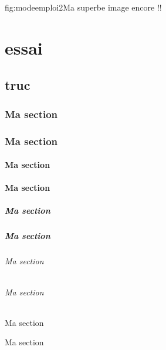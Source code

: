 \documentclass[overfullbox]{polytech}
\begin{document}
\begin{Figure}{fig:modeemploi2}{Ma superbe image encore !!}
\end{Figure}

\part{essai}
\label{part:essai}

\chapter{truc}
\lipsum[1-20]

\ref{part:essai}

\section{Ma section}
\lipsum[1-5]

\section{Ma section}
\lipsum[1-5]

\subsection{Ma section}
\lipsum[1-5]
\subsection{Ma section}
\lipsum[1-5]
\subsubsection{Ma section}
\lipsum[1-5]
\subsubsection{Ma section}
\lipsum[1-5]
\paragraph{Ma section}
\lipsum[1-5]
\paragraph{Ma section}
\lipsum[1-5]
\subparagraph{Ma section}
\lipsum[1-5]
\subparagraph{Ma section}
\lipsum[1-5]



\makeatletter


\makeatother





\begin{weeklyreports}
		\lipsum[1-2]
		\lipsum[3]
\end{weeklyreports}


\appendix
{}

\cite{key1,key2}
\nocite{*}




\makelastpage
\end{document}
